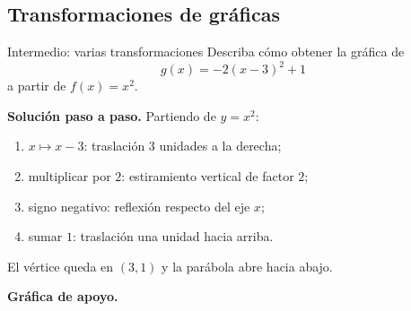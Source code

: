 \documentclass[aspectratio=169,10pt]{beamer}
\begin{document}
\subsection*{Transformaciones de gráficas}

\begin{frame}{Intermedio: varias transformaciones}
Describa cómo obtener la gráfica de
\[
g(x)=-2(x-3)^2+1
\]
a partir de $f(x)=x^2$.

\textbf{Solución paso a paso.} Partiendo de $y=x^2$:
\begin{enumerate}
\item $x\mapsto x-3$: traslación $3$ unidades a la derecha;
\item multiplicar por $2$: estiramiento vertical de factor $2$;
\item signo negativo: reflexión respecto del eje $x$;
\item sumar $1$: traslación una unidad hacia arriba.
\end{enumerate}
El vértice queda en $(3,1)$ y la parábola abre hacia abajo.


\textbf{Gráfica de apoyo.}\medskip
\begin{center}
\end{center}

\end{frame}
\end{document}
